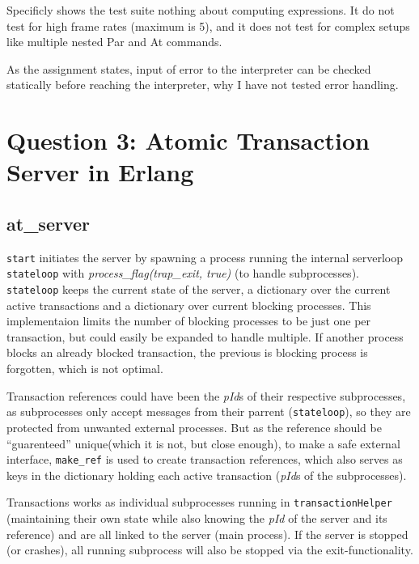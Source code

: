 \documentclass[a4paper, 10pt]{article}
\begin{document}
Specificly shows the test suite nothing about computing expressions. It do not test for high frame rates (maximum is 5), and it does not test for complex setups like multiple nested Par and At commands.

As the assignment states, input of error to the interpreter can be checked statically before reaching the interpreter, why I have not tested error handling.


\section{Question 3: Atomic Transaction Server in Erlang}
\subsection{at\_server}
\texttt{start} initiates the server by spawning a process running the internal serverloop \texttt{stateloop} with \textit{process\_flag(trap\_exit, true)} (to handle subprocesses). \texttt{stateloop} keeps the current state of the server, a dictionary over the current active transactions and a dictionary over current blocking processes. This implementaion limits the number of blocking processes to be just one per transaction, but could easily be expanded to handle multiple. If another process blocks an already blocked transaction, the previous is blocking process is forgotten, which is not optimal.

Transaction references could have been the \textit{pId}s of their respective subprocesses, as subprocesses only accept messages from their parrent (\texttt{stateloop}), so they are protected from unwanted external processes. But as the reference should be ``guarenteed'' unique(which it is not, but close enough), to make a safe external interface, \texttt{make\_ref} is used to create transaction references, which also serves as keys in the dictionary holding each active transaction (\textit{pId}s of the subprocesses).

Transactions works as individual subprocesses running in \texttt{transactionHelper} (maintaining their own state while also knowing the \textit{pId} of the server and its reference) and are all linked to the server (main process). If the server is stopped (or crashes), all running subprocess will also be stopped via the exit-functionality. 
\end{document}
